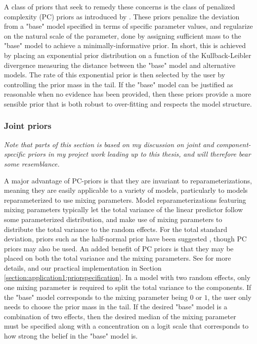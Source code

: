 A class of priors that seek to remedy these concerns is the class of penalized complexity (PC) priors as introduced by \cite{PC-priors}. These priors penalize the deviation from a "base" model specified in terms of specific parameter values, and regularize on the natural scale of the parameter, done by assigning sufficient mass to the "base" model to achieve a minimally-informative prior. In short, this is achieved by placing an exponential prior distribution on a function of the Kullback-Leibler divergence measuring the distance between the "base" model and alternative models. The rate of this exponential prior is then selected by the user by controlling the prior mass in the tail. If the "base" model can be justified as reasonable when no evidence has been provided, then these priors provide a more sensible prior that is both robust to over-fitting and respects the model structure.

\subsubsection{Joint priors}
\label{section:joint_priors}
\textit{Note that parts of this section is based on my discussion on joint and component-specific priors in my project work \citep{Prosjektoppgave} leading up to this thesis, and will therefore bear some resemblance.}

A major advantage of PC-priors is that they are invariant to reparameterizations, meaning they are easily applicable to a variety of models, particularly to models reparameterized to use mixing parameters. Model reparameterizations featuring mixing parameters typically let the total variance of the linear predictor follow some parameterized distribution, and make use of mixing parameters to distribute the total variance to the random effects. For the total standard deviation, priors such as the half-normal prior have been suggested \citep{gelmanHN}, though PC priors may also be used. An added benefit of PC priors is that they may be placed on both the total variance and the mixing parameters. See \cite{Jointprior} for more details, and our practical implementation in Section \ref{section:application1:priorspecification}. In a model with two random effects, only one mixing parameter is required to split the total variance to the components. If the "base" model corresponds to the mixing parameter being $0$ or $1$, the user only needs to choose the prior mass in the tail. If the desired "base" model is a combination of two effects, then the desired median of the mixing parameter must be specified along with a concentration on a logit scale that corresponds to how strong the belief in the "base" model is. 

